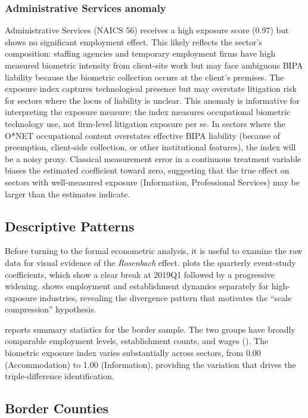 \documentclass[12pt]{article}
\begin{document}
\subsubsection*{Administrative Services anomaly} Administrative Services (NAICS 56) receives a high exposure score (0.97) but shows no significant employment effect. This likely reflects the sector's composition: staffing agencies and temporary employment firms have high measured biometric intensity from client-site work but may face ambiguous BIPA liability because the biometric collection occurs at the client's premises. The exposure index captures technological presence but may overstate litigation risk for sectors where the locus of liability is unclear. This anomaly is informative for interpreting the exposure measure: the index measures occupational biometric technology use, not firm-level litigation exposure per se. In sectors where the O*NET occupational content overstates effective BIPA liability (because of preemption, client-side collection, or other institutional features), the index will be a noisy proxy. Classical measurement error in a continuous treatment variable biases the estimated coefficient toward zero, suggesting that the true effect on sectors with well-measured exposure (Information, Professional Services) may be larger than the estimates indicate.

\subsection{Descriptive Patterns}

Before turning to the formal econometric analysis, it is useful to examine the raw data for visual evidence of the \textit{Rosenbach} effect.  plots the quarterly event-study coefficients, which show a clear break at 2019Q1 followed by a progressive widening.  shows employment and establishment dynamics separately for high-exposure industries, revealing the divergence pattern that motivates the ``scale compression'' hypothesis.

 reports summary statistics for the border sample. The two groups have broadly comparable employment levels, establishment counts, and wages (). The biometric exposure index varies substantially across sectors, from 0.00 (Accommodation) to 1.00 (Information), providing the variation that drives the triple-difference identification.

\subsection{Border Counties}
\end{document}

